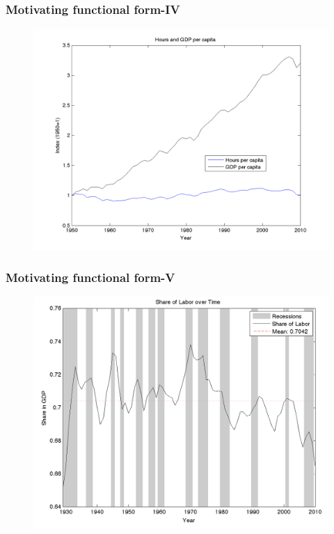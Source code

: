 \documentclass{beamer}
\begin{document}
\begin{frame}
\frametitle[alignment=center]{Motivating functional form-IV}
\begin{figure}
\centering
\includegraphics[scale=0.25]{Figures/HoursandGDP}
\end{figure}
\end{frame}

\begin{frame}
\frametitle[alignment=center]{Motivating functional form-V}
\begin{figure}
\centering
\includegraphics[scale=0.25]{Figures/LaborShare}
\end{figure}
\end{frame}
\end{document}
